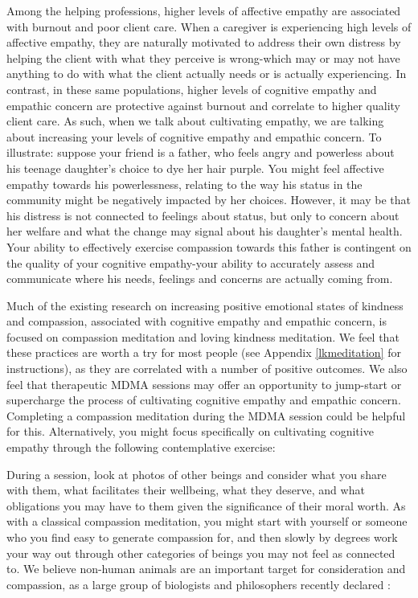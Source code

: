 \documentclass[12pt,letterpaper]{article}
\begin{document}
Among the helping professions, higher levels of affective empathy are associated with burnout and poor client care. When a caregiver is experiencing high levels of affective empathy, they are naturally motivated to address their own distress by helping the client with what they perceive is wrong-which may or may not have anything to do with what the client actually needs or is actually experiencing. In contrast, in these same populations, higher levels of cognitive empathy and empathic concern are protective against burnout and correlate to higher quality client care. As such, when we talk about cultivating empathy, we are talking about increasing your levels of cognitive empathy and empathic concern. To illustrate: suppose your friend is a father, who feels angry and powerless about his teenage daughter's choice to dye her hair purple. You might feel affective empathy towards his powerlessness, relating to the way his status in the community might be negatively impacted by her choices. However, it may be that his distress is not connected to feelings about status, but only to concern about her welfare and what the change may signal about his daughter's mental health. Your ability to effectively exercise compassion towards this father is contingent on the quality of your cognitive empathy-your ability to accurately assess and communicate where his needs, feelings and concerns are actually coming from.

Much of the existing research on increasing positive emotional states of kindness and compassion, associated with cognitive empathy and empathic concern, is focused on compassion meditation and loving kindness meditation. We feel that these practices are worth a try for most people (see Appendix \ref{lkmeditation} for instructions), as they are correlated with a number of positive outcomes. We also feel that therapeutic MDMA sessions may offer an opportunity to jump-start or supercharge the process of cultivating cognitive empathy and empathic concern. Completing a compassion meditation during the MDMA session could be helpful for this. Alternatively, you might focus specifically on cultivating cognitive empathy through the following contemplative exercise:

During a session, look at photos of other beings and consider what you share with them, what facilitates their wellbeing, what they deserve, and what obligations you may have to them given the significance of their moral worth. As with a classical compassion meditation, you might start with yourself or someone who you find easy to generate compassion for, and then slowly by degrees work your way out through other categories of beings you may not feel as connected to. We believe non-human animals are an important target for consideration and compassion, as a large group of biologists and philosophers recently declared \cite{newYorkAnimal}:
\end{document}
